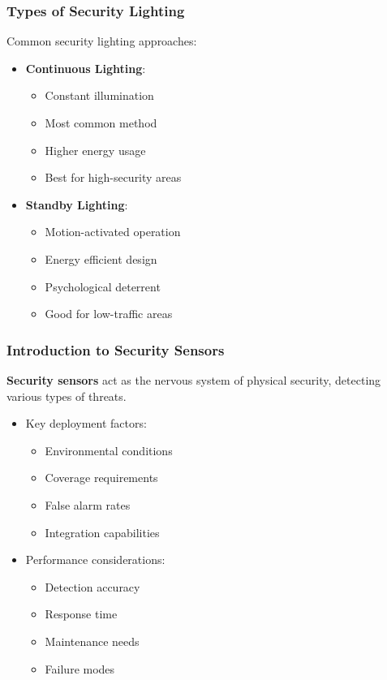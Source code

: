 \documentclass{beamer}
\begin{document}
\begin{frame}
    \frametitle{Types of Security Lighting}
    Common security lighting approaches:
    \begin{itemize}
        \item \textbf{Continuous Lighting}:
          \begin{itemize}
            \item Constant illumination
            \item Most common method
            \item Higher energy usage
            \item Best for high-security areas
          \end{itemize}
        \item \textbf{Standby Lighting}:
          \begin{itemize}
            \item Motion-activated operation
            \item Energy efficient design
            \item Psychological deterrent
            \item Good for low-traffic areas
          \end{itemize}
    \end{itemize}
\end{frame}

\begin{frame}
    \frametitle{Introduction to Security Sensors}
    \textbf{Security sensors} act as the nervous system of physical security, detecting various types of threats.
    \begin{itemize}
        \item Key deployment factors:
          \begin{itemize}
            \item Environmental conditions
            \item Coverage requirements
            \item False alarm rates
            \item Integration capabilities
          \end{itemize}
        \item Performance considerations:
          \begin{itemize}
            \item Detection accuracy
            \item Response time
            \item Maintenance needs
            \item Failure modes
          \end{itemize}
    \end{itemize}
\end{frame}
\end{document}
